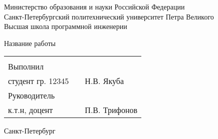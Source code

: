 \begin{titlepage}
  \begin{center}
    Министерство образования и науки Российской Федерации\\
    Санкт-Петербургский политехнический университет Петра Великого\\
    Высшая школа программной инженерии\\
  \end{center}
  \vspace{0.3\textheight}

  \begin{center}
    {\Huge Название работы}\\
    \vspace{0.05\textheight}
    \begin{tabular}{lll}
      & \hspace*{0.3\textwidth} & \\
      Выполнил & & \\
      студент гр. 12345& &Н.В. Якуба\\[0.5em]
      Руководитель & & \\
      к.т.н, доцент & & П.В. Трифонов\\
    \end{tabular}
    \vfill
    Санкт-Петербург\\
    \the\year 
  \end{center}
\end{titlepage}
